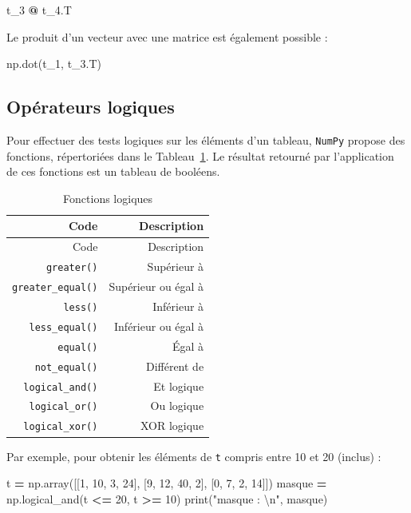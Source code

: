 \documentclass[12pt,]{book}
\newenvironment{Shaded}{\begin{snugshade}}{\end{snugshade}}
\newcommand{\DecValTok}[1]{\textcolor[rgb]{0.00,0.00,0.81}{#1}}
\newcommand{\CharTok}[1]{\textcolor[rgb]{0.31,0.60,0.02}{#1}}
\newcommand{\StringTok}[1]{\textcolor[rgb]{0.31,0.60,0.02}{#1}}
\newcommand{\OperatorTok}[1]{\textcolor[rgb]{0.81,0.36,0.00}{\textbf{#1}}}
\newcommand{\BuiltInTok}[1]{#1}
\newcommand{\NormalTok}[1]{#1}
\numberwithin{equation}{section}
\numberwithin{countremarque}{section}
\begin{document}
\begin{Shaded}
\begin{Highlighting}[]
\NormalTok{t_3 }\OperatorTok{@}\NormalTok{ t_4.T}
\end{Highlighting}
\end{Shaded}

Le produit d'un vecteur avec une matrice est également possible :

\begin{Shaded}
\begin{Highlighting}[]
\NormalTok{np.dot(t_1, t_3.T)}
\end{Highlighting}
\end{Shaded}

\subsection{Opérateurs logiques}\label{operateurs-logiques}

Pour effectuer des tests logiques sur les éléments d'un tableau,
\texttt{NumPy} propose des fonctions, répertoriées dans le
Tableau~\ref{tab:numpy-operateurs-logiques}. Le résultat retourné par
l'application de ces fonctions est un tableau de booléens.

\begin{longtable}[]{@{}rr@{}}
\caption{\label{tab:numpy-operateurs-logiques} Fonctions
logiques}\tabularnewline
\toprule
Code & Description\tabularnewline
\midrule
\endfirsthead
\toprule
Code & Description\tabularnewline
\midrule
\endhead
\texttt{greater()} & Supérieur à\tabularnewline
\texttt{greater\_equal()} & Supérieur ou égal à\tabularnewline
\texttt{less()} & Inférieur à\tabularnewline
\texttt{less\_equal()} & Inférieur ou égal à\tabularnewline
\texttt{equal()} & Égal à\tabularnewline
\texttt{not\_equal()} & Différent de\tabularnewline
\texttt{logical\_and()} & Et logique\tabularnewline
\texttt{logical\_or()} & Ou logique\tabularnewline
\texttt{logical\_xor()} & XOR logique\tabularnewline
\bottomrule
\end{longtable}

Par exemple, pour obtenir les éléments de \texttt{t} compris entre 10 et
20 (inclus) :

\begin{Shaded}
\begin{Highlighting}[]
\NormalTok{t }\OperatorTok{=}\NormalTok{ np.array([[}\DecValTok{1}\NormalTok{, }\DecValTok{10}\NormalTok{, }\DecValTok{3}\NormalTok{, }\DecValTok{24}\NormalTok{], [}\DecValTok{9}\NormalTok{, }\DecValTok{12}\NormalTok{, }\DecValTok{40}\NormalTok{, }\DecValTok{2}\NormalTok{], [}\DecValTok{0}\NormalTok{, }\DecValTok{7}\NormalTok{, }\DecValTok{2}\NormalTok{, }\DecValTok{14}\NormalTok{]])}
\NormalTok{masque }\OperatorTok{=}\NormalTok{ np.logical_and(t }\OperatorTok{<=} \DecValTok{20}\NormalTok{, t }\OperatorTok{>=} \DecValTok{10}\NormalTok{)}
\BuiltInTok{print}\NormalTok{(}\StringTok{"masque : }\CharTok{\textbackslash{}n}\StringTok{"}\NormalTok{, masque)}
\end{Highlighting}
\end{Shaded}
\end{document}
